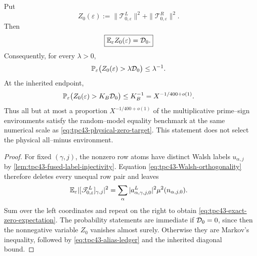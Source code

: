\begin{theorem}
\label{thm:tpc43-exact-zero-diagonalization}
Put
\begin{equation}
 Z_0(\varepsilon)
 :=\|\mathscr T_{0,\varepsilon}^L\|^2
   +\|\mathscr T_{0,\varepsilon}^R\|^2.
 \label{eq:tpc43-zero-random-energy}
\end{equation}
Then
\begin{equation}
 \boxed{\mathbb E_\varepsilon Z_0(\varepsilon)=\mathcal D_0.}
 \label{eq:tpc43-exact-zero-expectation}
\end{equation}
Consequently, for every \(\lambda>0\),
\begin{equation}
 \mathbb P_\varepsilon\bigl(Z_0(\varepsilon)>\lambda\mathcal D_0\bigr)
 \le\lambda^{-1}.
 \label{eq:tpc43-zero-Markov}
\end{equation}
At the inherited endpoint,
\begin{equation}
 \mathbb P_\varepsilon\bigl(
 Z_0(\varepsilon)>K_B\mathcal D_0
 \bigr)
 \le K_B^{-1}=X^{-1/400+o(1)}.
 \label{eq:tpc43-zero-endpoint-probability}
\end{equation}
Thus all but at most a proportion \(X^{-1/400+o(1)}\) of the
multiplicative prime--sign environments satisfy the random--model
equality benchmark at the same numerical scale as
\eqref{eq:tpc43-physical-zero-target}.  This statement does not select
the physical all--minus environment.
\end{theorem}

\begin{proof}
For fixed \((\gamma,j)\), the nonzero row atoms have distinct Walsh
labels \(u_{\alpha,j}\) by
\cref{lem:tpc43-fused-label-injectivity}.  Equation
\eqref{eq:tpc43-Walsh-orthogonality} therefore deletes every unequal row
pair and leaves
\begin{equation}
 \mathbb E_\varepsilon
 |[\mathscr T_{0,\varepsilon}^L]_{\gamma,j}|^2
 =\sum_\alpha
 |a^L_{\alpha,\gamma,j,0}|^2
 \mu^2(n_{\alpha,j,0}).
 \label{eq:tpc43-zero-coordinate-diagonal}
\end{equation}
Sum over the left coordinates and repeat on the right to obtain
\eqref{eq:tpc43-exact-zero-expectation}.  The probability statements
are immediate if \(\mathcal D_0=0\), since then the nonnegative variable
\(Z_0\) vanishes almost surely.  Otherwise they are Markov's inequality,
followed by
\eqref{eq:tpc43-alias-ledger} and the inherited diagonal bound.
\end{proof}
